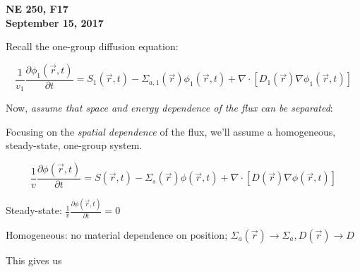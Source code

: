 \documentclass[12pt]{article}
\newif\ifeqns
\newcommand{\rvec}{\ensuremath{\vec{r}}}
\newcommand{\vecr}{\ensuremath{\vec{r}}}
\begin{document}
\begin{center}
{\bf NE 250, F17\\
September 15, 2017 
}
\end{center}

Recall the one-group diffusion equation:

\begin{equation*}
\frac{1}{v_1}\frac{\partial \phi_1(\rvec,t)}{\partial t} = S_1(\rvec,t) - 
\Sigma_{a,1}(\rvec)\phi_1(\rvec,t) + \nabla\cdot[D_1(\rvec)\nabla\phi_1(\rvec,t)]
\end{equation*}

Now, \textit{assume that space and energy dependence of the flux can be separated}:
\ifeqns
\begin{equation*}
\phi(\vecr,E,t) = \phi(\vecr,t)\xi(E), 
\text{ where $\xi(E)$ is the neutron spectrum and $\int_0^{\infty}dE\:\psi(E) = 1$.}
\end{equation*}
\else
\vspace*{3em}
\fi

Focusing on the \textit{spatial dependence} of the flux, we'll assume a homogeneous, steady-state, one-group system.

\begin{equation*}
\frac{1}{v}\frac{\partial\phi(\rvec,t)}{\partial t} = S(\rvec,t) - \Sigma_s(\rvec)\phi(\rvec,t)
+ \nabla\cdot[D(\rvec)\nabla\phi(\rvec,t)]
\end{equation*}

Steady-state: $\frac{1}{v}\frac{\partial\phi(\rvec,t)}{\partial t} = 0$

Homogeneous: no material dependence on position; 
$\Sigma_a(\rvec)\rightarrow\Sigma_a, D(\rvec)\rightarrow D$

This gives us
%
%
%
\ifeqns
\begin{equation*}
\nabla^2\phi(\vecr) - \frac{1}{L^2}\phi(\rvec) = -\frac{S(\rvec)}{D},
\text{ where $L = \sqrt{\frac{D}{\Sigma_a}} =$ diffusion length.}
\end{equation*}
\else
\vspace*{3em}
\fi

\end{document}
